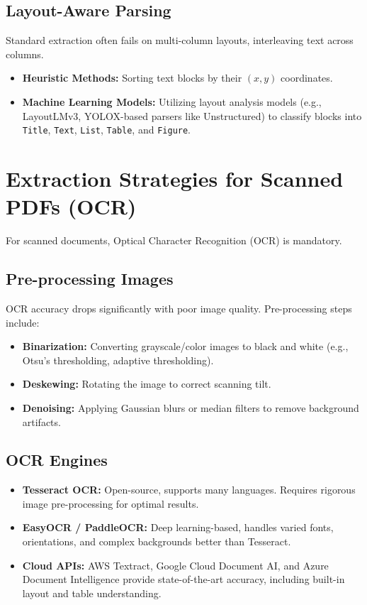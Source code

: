 \documentclass[12pt, a4paper]{article}
\begin{document}
\subsection{Layout-Aware Parsing}
Standard extraction often fails on multi-column layouts, interleaving text across columns.
\begin{itemize}
    \item \textbf{Heuristic Methods:} Sorting text blocks by their $(x, y)$ coordinates.
    \item \textbf{Machine Learning Models:} Utilizing layout analysis models (e.g., LayoutLMv3, YOLOX-based parsers like Unstructured) to classify blocks into \texttt{Title}, \texttt{Text}, \texttt{List}, \texttt{Table}, and \texttt{Figure}.
\end{itemize}

\section{Extraction Strategies for Scanned PDFs (OCR)}
For scanned documents, Optical Character Recognition (OCR) is mandatory.

\subsection{Pre-processing Images}
OCR accuracy drops significantly with poor image quality. Pre-processing steps include:
\begin{itemize}
    \item \textbf{Binarization:} Converting grayscale/color images to black and white (e.g., Otsu's thresholding, adaptive thresholding).
    \item \textbf{Deskewing:} Rotating the image to correct scanning tilt.
    \item \textbf{Denoising:} Applying Gaussian blurs or median filters to remove background artifacts.
\end{itemize}

\subsection{OCR Engines}
\begin{itemize}
    \item \textbf{Tesseract OCR:} Open-source, supports many languages. Requires rigorous image pre-processing for optimal results.
    \item \textbf{EasyOCR / PaddleOCR:} Deep learning-based, handles varied fonts, orientations, and complex backgrounds better than Tesseract.
    \item \textbf{Cloud APIs:} AWS Textract, Google Cloud Document AI, and Azure Document Intelligence provide state-of-the-art accuracy, including built-in layout and table understanding.
\end{itemize}
\end{document}
